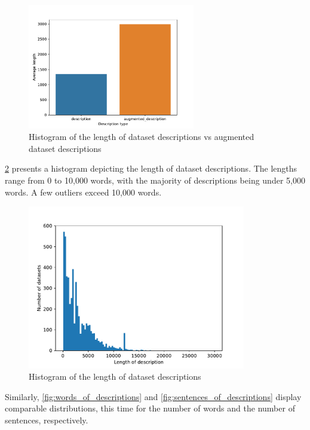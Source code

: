 \begin{figure}[h]
    \centering
    \includegraphics[width=0.65\textwidth]{figures/description_vs_augmented_description.pdf}
    \caption{Histogram of the length of dataset descriptions vs augmented dataset descriptions}
    \label{fig:description_vs_augmented_description}
\end{figure}

\cref{fig:length_of_descriptions} presents a histogram depicting the length of dataset descriptions. The lengths range from 0 to 10,000 words, with the majority of descriptions being under 5,000 words. A few outliers exceed 10,000 words.

\begin{figure}[h]
    \centering
    \includegraphics[width=0.85\textwidth]{figures/length_of_descriptions.pdf}
    \caption{Histogram of the length of dataset descriptions}
    \label{fig:length_of_descriptions}
\end{figure}

Similarly, \cref{fig:words_of_descriptions} and \cref{fig:sentences_of_descriptions} display comparable distributions, this time for the number of words and the number of sentences, respectively.

